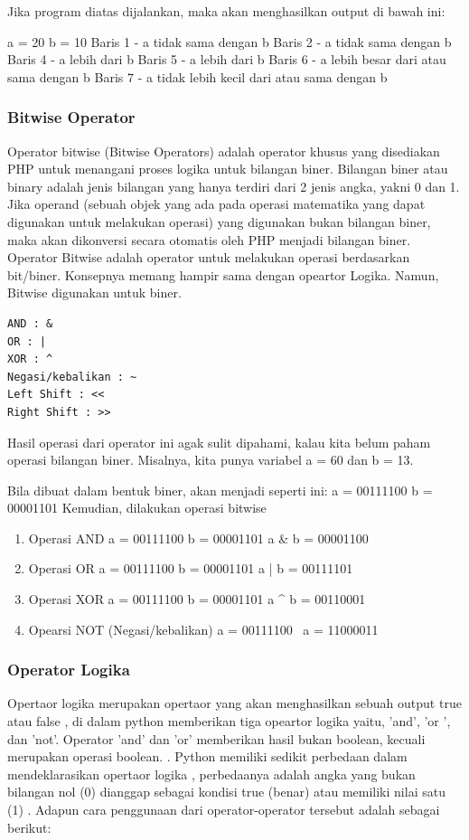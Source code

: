 \begin{eqation}
Jika program diatas dijalankan, maka akan menghasilkan output di bawah ini:

a =  20
b =  10
Baris 1 - a tidak sama dengan b
Baris 2 - a tidak sama dengan b
Baris 4 - a lebih dari b
Baris 5 - a lebih dari b
Baris 6 - a lebih besar dari atau sama dengan b
Baris 7 - a tidak lebih kecil dari atau sama dengan b

\subsubsection{Bitwise Operator}
Operator bitwise (Bitwise Operators) adalah operator khusus yang disediakan PHP untuk menangani proses logika untuk bilangan biner. Bilangan biner atau binary adalah jenis bilangan yang hanya terdiri dari 2 jenis angka, yakni 0 dan 1. Jika operand (sebuah objek yang ada pada operasi matematika yang dapat digunakan untuk melakukan operasi) yang digunakan bukan bilangan biner, maka akan dikonversi secara otomatis oleh PHP menjadi bilangan biner. Operator Bitwise adalah operator untuk melakukan operasi berdasarkan bit/biner. Konsepnya memang hampir sama dengan opeartor Logika. Namun, Bitwise digunakan untuk biner.
\begin{verbatim}
AND : &
OR : |
XOR : ^
Negasi/kebalikan : ~
Left Shift : <<
Right Shift : >>
\end{verbatim}

Hasil operasi dari operator ini agak sulit dipahami, kalau kita belum paham operasi bilangan biner.
Misalnya, kita punya variabel a = 60 dan b = 13.

Bila dibuat dalam bentuk biner, akan menjadi seperti ini:
a = 00111100
b = 00001101
Kemudian, dilakukan operasi bitwise

\begin{enumerate}
\item Operasi AND
      a = 00111100
      b = 00001101
      a & b = 00001100
      
\item Operasi OR
      a = 00111100
      b = 00001101
      a | b = 00111101

\item Operasi XOR
      a = 00111100
      b = 00001101
      a ^ b = 00110001

\item Opearsi NOT (Negasi/kebalikan)
      a = 00111100
      ~a  = 11000011
      
\end{enumerate}


\subsubsection{Operator Logika}
Opertaor logika merupakan opertaor yang akan menghasilkan sebuah output true atau false , di dalam python memberikan tiga opeartor logika yaitu, 'and', 'or ', dan 'not'. Operator 'and' dan 'or' memberikan hasil bukan boolean, kecuali merupakan operasi boolean. . Python memiliki sedikit perbedaan dalam mendeklarasikan opertaor logika , perbedaanya adalah angka yang bukan bilangan nol (0) dianggap sebagai kondisi true (benar) atau memiliki nilai satu (1) .
Adapun cara penggunaan dari operator-operator tersebut adalah sebagai berikut:


\end{eqation}
